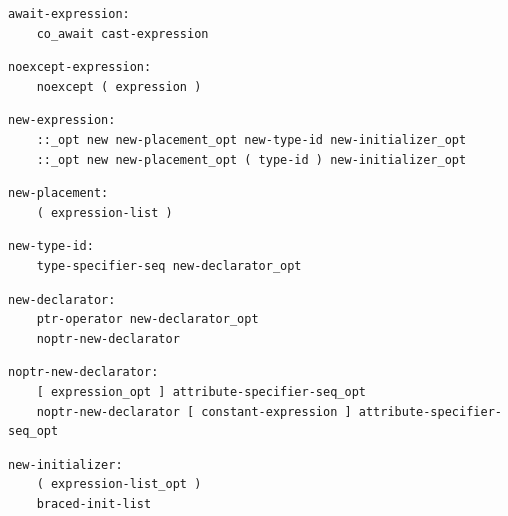 \noindent\textbf{\texttt{}}\par
\begin{lstlisting}
await-expression:
    co_await cast-expression
\end{lstlisting}

\noindent\textbf{\texttt{}}\par
\begin{lstlisting}
noexcept-expression:
    noexcept ( expression )
\end{lstlisting}

\noindent\textbf{\texttt{}}\par
\begin{lstlisting}
new-expression:
    ::_opt new new-placement_opt new-type-id new-initializer_opt
    ::_opt new new-placement_opt ( type-id ) new-initializer_opt
\end{lstlisting}

\noindent\textbf{\texttt{}}\par
\begin{lstlisting}
new-placement:
    ( expression-list )
\end{lstlisting}

\noindent\textbf{\texttt{}}\par
\begin{lstlisting}
new-type-id:
    type-specifier-seq new-declarator_opt
\end{lstlisting}

\noindent\textbf{\texttt{}}\par
\begin{lstlisting}
new-declarator:
    ptr-operator new-declarator_opt
    noptr-new-declarator
\end{lstlisting}

\noindent\textbf{\texttt{}}\par
\begin{lstlisting}
noptr-new-declarator:
    [ expression_opt ] attribute-specifier-seq_opt
    noptr-new-declarator [ constant-expression ] attribute-specifier-seq_opt
\end{lstlisting}

\noindent\textbf{\texttt{}}\par
\begin{lstlisting}
new-initializer:
    ( expression-list_opt )
    braced-init-list
\end{lstlisting}

